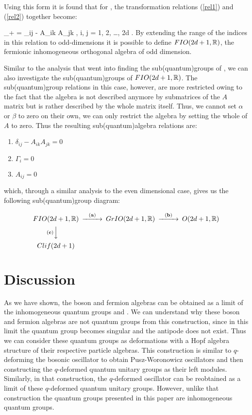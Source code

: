 Using this form it is found that for \FIO, the transformation
relations (\ref{rel1}) and (\ref{rel2}) together become:

_+ = \delta_{ij} - A_{ik} A_{jk}
\quad\quad, i, j = 1, 2, \ldots , 2d . \eeq By extending the range
of the indices in this relation to odd-dimensions it is possible
to define $FIO(2d + 1, \mathbb{R})$, the fermionic inhomogeneous
orthogonal algebra of odd dimension.

Similar to the analysis that went into finding the
sub(quantum)groups of \FIO, we can also investigate the
sub(quantum)groups of $FIO(2d + 1, \mathbb{R})$. The sub(quantum)group
relations in this case, however, are more restricted owing to the
fact that the algebra is not described anymore by submatrices of
the $A$ matrix but is rather described by the whole matrix itself.
Thus, we cannot set $\alpha$ or $\beta$ to zero on their own, we
can only restrict the algebra by setting the whole of $A$ to zero.
Thus the resulting sub(quantum)algebra relations are:

\begin{enumerate}
\renewcommand{\labelenumi}{\bf(\alph{enumi})}
\item $\delta_{ij} - A_{ik}A_{jk} = 0$
\item $\Gamma_i = 0$
\item $A_{ij} = 0$
\end{enumerate}
which, through a similar analysis to the even dimensional case,
gives us the following sub(quantum)group diagram:

\[
\begin{CD}
{FIO(2d + 1, \IR)} @>{\bf (a)}>> {GrIO(2d + 1, \IR)} @>{\bf (b)}>> {O(2d + 1, \IR)} \\
@V{\bf (c)}VV\\
{Clif(2d + 1)}
\end{CD}
\]

\section{Discussion}
As we have shown, the boson and fermion algebras can be obtained
as a limit of the inhomogeneous quantum groups \BISp and \FIO. We
can understand why these boson and fermion algebras are not
quantum groups from this construction, since in this limit the
quantum group becomes singular and the antipode does not exist.
Thus we can consider these quantum groups as deformations with a
Hopf algebra structure of their respective particle algebras. This
construction is similar to $q$-deforming the bosonic oscillator to
obtain Pusz-Woronowicz \cite{puszwor} oscillators and then
constructing the $q$-deformed quantum unitary groups as their left
modules. Similarly, in that construction, the $q$-deformed
oscillator can be reobtained as a limit of these $q$-deformed
quantum unitary groups. However, unlike that construction the
quantum groups presented in this paper are inhomogeneous quantum
groups.

